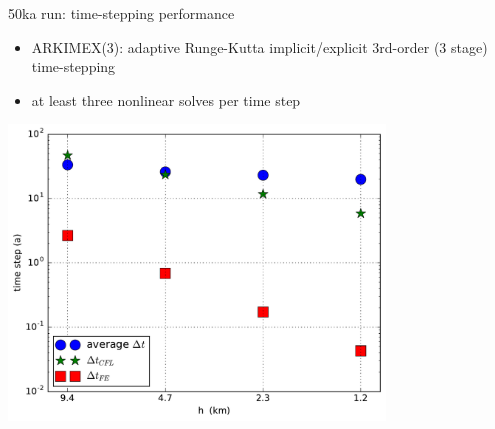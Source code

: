\documentclass[hide notes,intlimits,usenames,dvipsnames]{beamer}
\begin{document}
\begin{frame}{50ka run: time-stepping performance}
\begin{itemize}
\item ARKIMEX(3): adaptive Runge-Kutta implicit/explicit 3rd-order (3 stage) time-stepping
\item at least three nonlinear solves per time step
\end{itemize}
\begin{center}
\includegraphics[width=0.75\textwidth]{dtfiftyka.pdf}
\end{center}
\end{frame}
\end{document}
